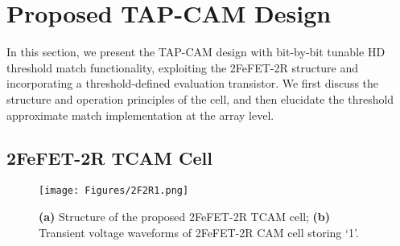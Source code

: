 



\section{Proposed TAP-CAM Design}
\label{sec:proposed_work}
In this section, we present the TAP-CAM design with bit-by-bit tunable HD threshold match functionality, exploiting the 2FeFET-2R structure and incorporating a threshold-defined evaluation transistor. 
We first discuss the structure and operation principles of the cell, %
and then elucidate the threshold approximate match implementation at the array level.


\subsection{2FeFET-2R TCAM Cell} 

\begin{figure}
    \centering
    \texttt{[image: Figures/2F2R1.png]}
    \caption{\textbf{(a)} Structure of the proposed 2FeFET-2R TCAM cell; \textbf{(b)} Transient voltage waveforms of 2FeFET-2R CAM cell storing `1’.}
\label{fig:2FeFET-2R Cell}

\end{figure}

